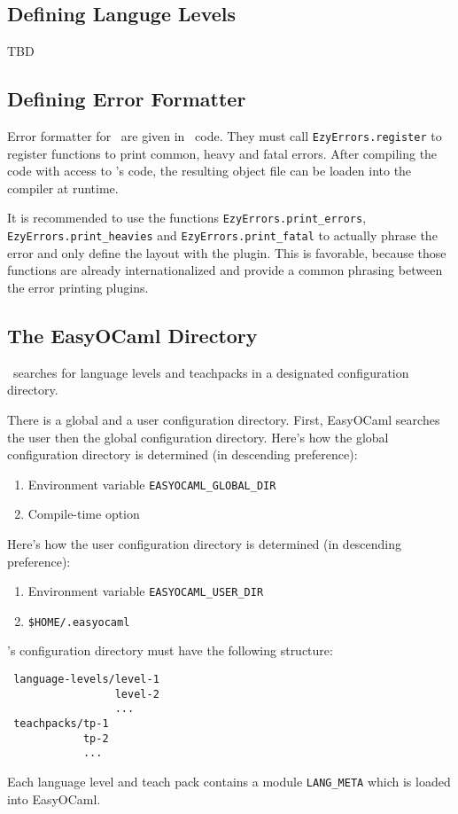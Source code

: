 \subsection{Defining Languge Levels}
TBD

\subsection{Defining Error Formatter}

Error formatter for \easyocaml\ are given in \ocaml\ code. They must call
\texttt{EzyErrors.register} to register functions to print common, heavy and
fatal errors. After compiling the code with access to \easyocaml's code, the
resulting object file can be loaden into the compiler at runtime.

It is recommended to use the functions \texttt{EzyErrors.print\_errors},
\texttt{EzyErrors.print\_heavies} and \texttt{EzyErrors.print\_fatal} to
actually phrase the error and only define the layout with the plugin. This is
favorable, because those functions are already internationalized and provide a
common phrasing between the error printing plugins.

\subsection{The EasyOCaml Directory}
\label{sec:directory}

\easyocaml\ searches for language levels and teachpacks in a designated
configuration directory.

There is a global and a user configuration directory. First, EasyOCaml 
searches the user then the global configuration directory.  Here's how 
the global configuration directory is determined (in descending 
preference):

\begin{enumerate}
    \item Environment variable \texttt{EASYOCAML\_GLOBAL\_DIR}
    \item Compile-time option
\end{enumerate}

Here's how the user configuration directory is determined (in descending 
preference):

\begin{enumerate}
    \item Environment variable \texttt{EASYOCAML\_USER\_DIR}
    \item \texttt{\$HOME/.easyocaml}
\end{enumerate}

\easyocaml's configuration directory must have the following structure:

\begin{verbatim}
 language-levels/level-1
                 level-2
                 ...
 teachpacks/tp-1
            tp-2
            ...
\end{verbatim}

Each language level and teach pack contains a module \texttt{LANG\_META} 
which is loaded into EasyOCaml.

